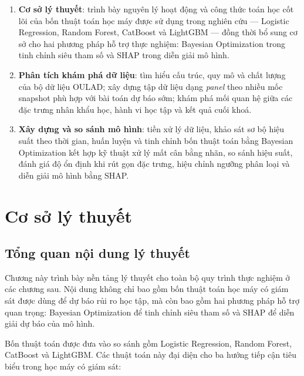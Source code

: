 \documentclass[a4paper]{report}
\begin{document}
\begin{enumerate}[leftmargin=*]
  \item \textbf{Cơ sở lý thuyết}: trình bày nguyên lý hoạt động và công thức
        toán học cốt lõi của bốn thuật toán học máy được sử dụng trong nghiên
        cứu --- Logistic Regression, Random Forest, CatBoost và LightGBM ---
        đồng thời bổ sung cơ sở cho hai phương pháp hỗ trợ thực nghiệm:
        Bayesian Optimization trong tinh chỉnh siêu tham số và SHAP trong diễn
        giải mô hình.
  \item \textbf{Phân tích khám phá dữ liệu}: tìm hiểu cấu trúc, quy mô và
        chất lượng của bộ dữ liệu OULAD; xây dựng tập dữ liệu dạng
        \textit{panel} theo nhiều mốc snapshot phù hợp với bài
        toán dự báo sớm; khám phá mối quan hệ giữa các đặc trưng nhân khẩu
        học, hành vi học tập và kết quả cuối khoá.
  \item \textbf{Xây dựng và so sánh mô hình}: tiền xử lý dữ liệu, khảo sát sơ
        bộ hiệu suất theo thời gian, huấn luyện và tinh chỉnh bốn thuật toán
        bằng Bayesian Optimization kết hợp kỹ thuật xử lý mất cân bằng nhãn,
        so sánh hiệu suất, đánh giá độ ổn định khi rút gọn đặc trưng, hiệu
        chỉnh ngưỡng phân loại và diễn giải mô hình bằng SHAP.
\end{enumerate}

\chapter{Cơ sở lý thuyết}
\label{part:theory}

\section{Tổng quan nội dung lý thuyết}

Chương này trình bày nền tảng lý thuyết cho toàn bộ quy trình thực nghiệm ở
các chương sau. Nội dung không chỉ bao gồm bốn thuật toán học máy có giám sát
được dùng để dự báo rủi ro học tập, mà còn bao gồm hai phương pháp hỗ trợ quan
trọng: Bayesian Optimization để tinh chỉnh siêu tham số và SHAP để diễn giải
dự báo của mô hình.

Bốn thuật toán được đưa vào so sánh gồm Logistic Regression, Random Forest,
CatBoost và LightGBM. Các thuật toán này đại diện cho ba hướng tiếp cận tiêu
biểu trong học máy có giám sát:
\end{document}
